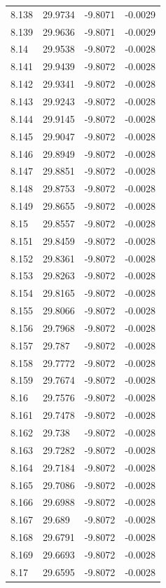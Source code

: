 \begin{tabular}{llll}
8.138 & 29.9734 & -9.8071 & -0.0029 \\
8.139 & 29.9636 & -9.8071 & -0.0029 \\
8.14 & 29.9538 & -9.8072 & -0.0028 \\
8.141 & 29.9439 & -9.8072 & -0.0028 \\
8.142 & 29.9341 & -9.8072 & -0.0028 \\
8.143 & 29.9243 & -9.8072 & -0.0028 \\
8.144 & 29.9145 & -9.8072 & -0.0028 \\
8.145 & 29.9047 & -9.8072 & -0.0028 \\
8.146 & 29.8949 & -9.8072 & -0.0028 \\
8.147 & 29.8851 & -9.8072 & -0.0028 \\
8.148 & 29.8753 & -9.8072 & -0.0028 \\
8.149 & 29.8655 & -9.8072 & -0.0028 \\
8.15 & 29.8557 & -9.8072 & -0.0028 \\
8.151 & 29.8459 & -9.8072 & -0.0028 \\
8.152 & 29.8361 & -9.8072 & -0.0028 \\
8.153 & 29.8263 & -9.8072 & -0.0028 \\
8.154 & 29.8165 & -9.8072 & -0.0028 \\
8.155 & 29.8066 & -9.8072 & -0.0028 \\
8.156 & 29.7968 & -9.8072 & -0.0028 \\
8.157 & 29.787 & -9.8072 & -0.0028 \\
8.158 & 29.7772 & -9.8072 & -0.0028 \\
8.159 & 29.7674 & -9.8072 & -0.0028 \\
8.16 & 29.7576 & -9.8072 & -0.0028 \\
8.161 & 29.7478 & -9.8072 & -0.0028 \\
8.162 & 29.738 & -9.8072 & -0.0028 \\
8.163 & 29.7282 & -9.8072 & -0.0028 \\
8.164 & 29.7184 & -9.8072 & -0.0028 \\
8.165 & 29.7086 & -9.8072 & -0.0028 \\
8.166 & 29.6988 & -9.8072 & -0.0028 \\
8.167 & 29.689 & -9.8072 & -0.0028 \\
8.168 & 29.6791 & -9.8072 & -0.0028 \\
8.169 & 29.6693 & -9.8072 & -0.0028 \\
8.17 & 29.6595 & -9.8072 & -0.0028 \\

\end{tabular}
